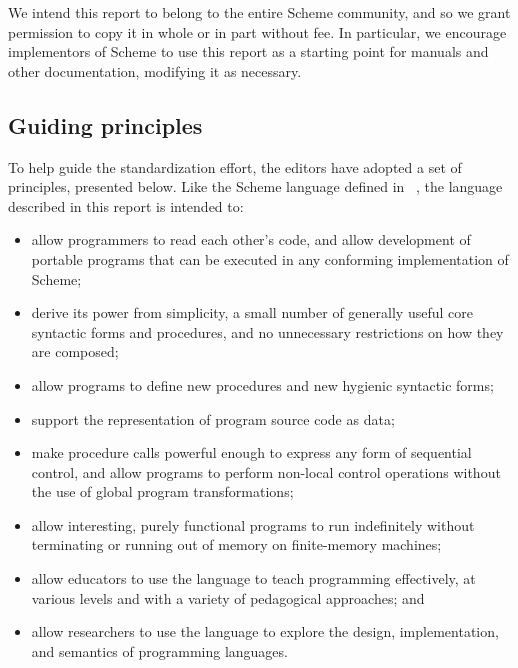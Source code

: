 \medskip

We intend this report to belong to the entire Scheme community, and so
we grant permission to copy it in whole or in part without fee.  In
particular, we encourage implementors of Scheme to use this report as
a starting point for manuals and other documentation, modifying it as
necessary.

\subsection*{Guiding principles}

To help guide the standardization effort, the editors have adopted a
set of principles, presented below.
Like the Scheme language defined in ~\cite{R5RS}, the language described
in this report is intended to:

\begin{itemize}
\item allow programmers to read each other's code, and allow
  development of portable programs that can be executed in any
  conforming implementation of Scheme;

\item derive its power from simplicity, a small number of generally
  useful core syntactic forms and procedures, and no unnecessary
  restrictions on how they are composed;
  
\item allow programs to define new procedures and new hygienic
  syntactic forms;
  
\item support the representation of program source code as data;
  
\item make procedure calls powerful enough to express any form of
  sequential control, and allow programs to perform non-local control
  operations without the use of global program transformations;
  
\item allow interesting, purely functional programs to run indefinitely
  without terminating or running out of memory on finite-memory
  machines;
  
\item allow educators to use the language to teach programming
  effectively, at various levels and with a variety of pedagogical
  approaches; and

\item allow researchers to use the language to explore the design,
  implementation, and semantics of programming languages.
\end{itemize}

